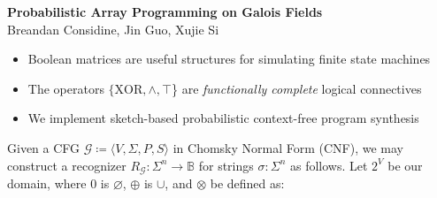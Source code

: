 \documentclass[portrait,a0b,final,a4resizeable]{a0poster}
\def\jointspacing{\vspace{0.3in}}
\begin{document}
  \begin{poster}
    \vspace{1\baselineskip}   %


    \begin{center}
      \begin{pcolumn}{1.03}
        \begin{minipage}[c][9cm][c]{0.85\textwidth}
          \begin{center}
          {\veryHuge \textbf{Probabilistic Array Programming on Galois Fields}}\\[10mm]
          {\huge Breandan Considine, Jin Guo, Xujie Si\\[7.5mm]
          }
          \end{center}
        \end{minipage}
      \end{pcolumn}
    \end{center}

    \vspace*{1.5cm}

    \large



    \Large

    \begin{multicols}{2}



      \vspace*{-1cm}
      \null\hspace*{3cm}\begin{minipage}[c]{0.85\columnwidth}
      \begin{itemize}
        \item Boolean matrices are useful structures for simulating finite state machines
        \item The operators $\{\text{XOR}, \land, \top$\} are \textit{functionally complete} logical connectives
        \item We implement sketch-based probabilistic context-free program synthesis
      \end{itemize}
      \end{minipage}

      \jointspacing

      \null\hspace*{3cm}\begin{minipage}[c]{0.85\columnwidth}
          Given a CFG $\mathcal{G} \coloneqq \langle V, \Sigma, P, S\rangle$ in Chomsky Normal Form (CNF), we may construct a recognizer $R_\mathcal{G}: \Sigma^n \rightarrow \mathbb{B}$ for strings $\sigma: \Sigma^n$ as follows. Let $\mathcal 2^V$ be our domain, where $0$ is $\varnothing$, $\oplus$ is $\cup$, and $\otimes$ be defined as:\\
      \end{minipage}


\end{multicols}
\end{poster}
\end{document}
